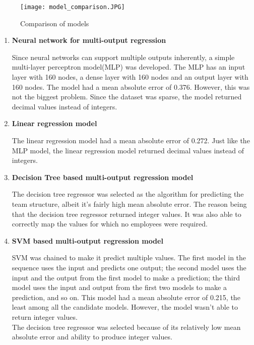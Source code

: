 \documentclass{ws-ijseke}
\begin{document}
\begin{figure}[htp]
\texttt{[image: model\_comparison.JPG]}
\centering
\caption{Comparison of models}
\end{figure}

\begin{enumerate}
\item \textbf{Neural network for multi-output regression}

Since neural networks can support multiple outputs inherently, a simple multi-layer perceptron model(MLP) was developed.  The MLP has an input layer with 160 nodes, a dense layer with 160 nodes and an output layer with 160 nodes. The model had a mean absolute error of 0.376. However, this was not the biggest problem. Since the dataset was sparse, the model returned decimal values instead of integers. \\

\item \textbf{Linear regression model}

The linear regression model had a mean absolute error of 0.272. Just like the MLP model, the linear regression model returned decimal values instead of integers. \\

\item \textbf{Decision Tree based multi-output regression model}

The decision tree regressor was selected as the algorithm for predicting the team structure, albeit it’s fairly high mean absolute  error. The reason being that the decision tree regressor returned integer values. It was also able to correctly map the values for which no employees were required. \\

\item \textbf{SVM based multi-output regression model}

SVM was chained to make it predict multiple values. The first model in the sequence uses the input and predicts one output; the second model uses the input and the output from the first model to make a prediction; the third model uses the input and output from the first two models to make a prediction, and so on. This model had a mean absolute error of 0.215, the least among all the candidate models. However, the model wasn’t able to return integer values. \\

The decision tree regressor was selected because of its relatively low mean absolute error and ability to produce integer values.  
\end{enumerate}
\end{document}
